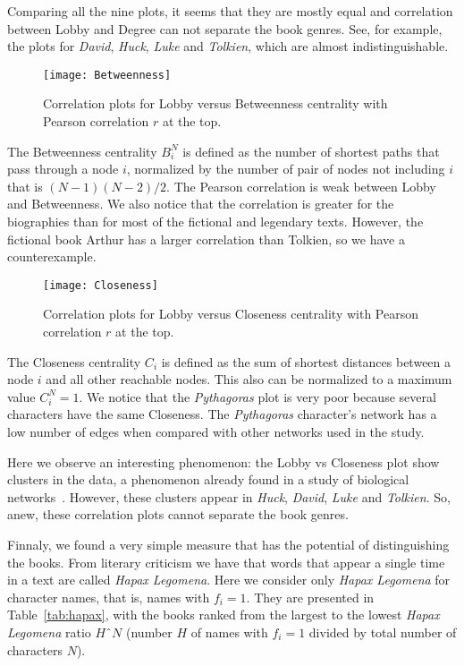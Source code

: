 \documentclass[review]{elsarticle}
\begin{document}
Comparing all the nine plots, it seems that they are mostly
equal and correlation between Lobby and Degree can not separate
the book genres. See, for example, the plots for
\emph{David}, \emph{Huck}, \emph{Luke} 
and \emph{Tolkien}, which are almost indistinguishable.

\begin{figure}[ht]
\centering
\texttt{[image: Betweenness]}
\caption{\label{FigB} Correlation plots for Lobby 
versus Betweenness centrality 
with Pearson correlation $r$ at the top.}
\end{figure}

The Betweenness centrality $B_i^N$ is  defined 
as the number of shortest paths that 
pass through a node $i$, normalized 
by the number of pair of nodes not including $i$ that 
is $(N-1)(N-2)/2$. The Pearson correlation is weak between
Lobby and Betweenness. We also notice that
the correlation is greater for the biographies than for
most of the fictional and legendary texts. 
However, the fictional book Arthur has a 
larger correlation than Tolkien, so we have a counterexample.

\begin{figure}[ht]
\centering
\texttt{[image: Closeness]}
\caption{\label{FigC} Correlation plots for  
Lobby versus Closeness centrality 
with Pearson correlation $r$ at the top.}
\end{figure}

The Closeness centrality $C_i$ is  defined as 
the sum of shortest distances 
between a node $i$ and all other reachable nodes.
This also can be normalized to a maximum value $C^N_i=1$.
We notice that the \emph{Pythagoras} 
plot is very poor because several
characters have the same Closeness. 
The \emph{Pythagoras} character's 
network has a low number of edges when compared 
with other networks used in the study.

Here we observe an interesting phenomenon: 
the Lobby vs Closeness plot
show clusters in the data, a phenomenon already found in a study
of biological networks~\cite{campiteli2013lobby}. However,
these clusters appear in \emph{Huck}, \emph{David},
\emph{Luke} and \emph{Tolkien}. So, anew, these correlation plots 
cannot separate the book genres.


Finnaly, we found a very simple measure that has the potential
of distinguishing the books. 
From literary criticism we have that words that 
appear a single time in a text are called 
\emph{Hapax Legomena}.
Here we consider only \emph{Hapax Legomena} for character names,
that is, names with $f_i=1$. They are presented 
in Table~\ref{tab:hapax},
with the books ranked from the largest to the lowest
\emph{Hapax Legomena} ratio $HˆN$ (number $H$ of names with 
$f_i = 1$ divided by  total number of characters $N$).
\end{document}
